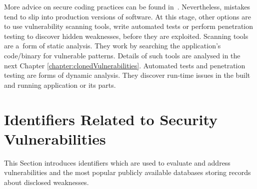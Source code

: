   More advice on secure coding practices can be found in~\cite{SecureCodingPractices}. Nevertheless, mistakes
  tend to slip into production versions of software. At this stage, other options are to use vulnerability
  scanning tools, write automated tests or perform penetration testing to discover hidden weaknesses, before
  they are exploited. Scanning tools are a~form of static analysis. They work by searching the application's
  code/binary for vulnerable patterns. Details of such tools are analysed in the next Chapter
  \ref{chapter:clonedVulnerabilities}. Automated tests and penetration testing are forms of dynamic analysis.
  They discover run-time issues in the built and running application or its parts.

  \section{Identifiers Related to Security Vulnerabilities}
  This Section introduces identifiers which are used to evaluate and address vulnerabilities and the most popular
  publicly available databases storing records about disclosed weaknesses.

